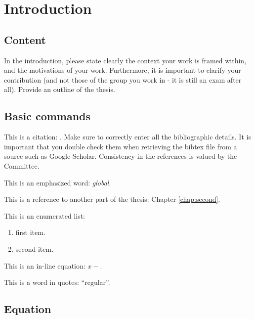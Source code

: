 
\chapter{Introduction}
\label{chap:first}
\ifpdf
    \graphicspath{{Chapter1/Figures/PNG/}{Chapter1/Figures/PDF/}{Chapter1/Figures/}{Chapter1/Figures/EPS/}}
\else
    \graphicspath{{Chapter1/Figures/EPS/}{Chapter1/Figures/}}
\fi


\section{Content}
In the introduction, please state clearly the context your work is framed within, and the motivations of your work. Furthermore, 
it is important to clarify your contribution (and not those of the group you work in - it is still an exam after all). Provide an outline of the thesis.

\section{Basic commands}
\label{sec:basic_commands}
This is a citation: \cite{cacciaActiveSonarbasedBottomfollowing1999}. Make sure to correctly enter all the bibliographic details. 
It is important that you double check them when retrieving the bibtex file from a source such as Google Scholar. Consistency in the references is valued by the Committee.

This is an emphasized word: \emph{global}.

This is a reference to another part of the thesis: Chapter \ref{chap:second}.

This is an enumerated list:
\begin{enumerate}
\item first item.
\item second item.
\end{enumerate}

This is an in-line equation: $x-$.

This is a word in quotes: ``regular''.

\section{Equation}
\label{sec:equation}

